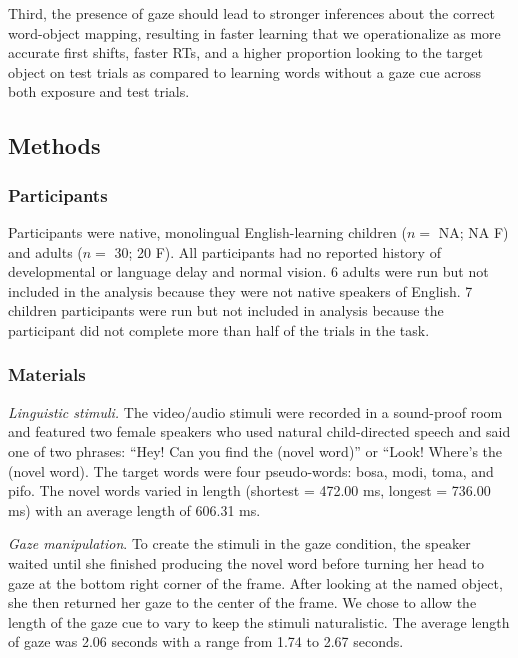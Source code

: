 \documentclass[man,floatsintext]{apa6}
\begin{document}
Third, the presence of gaze should lead to stronger inferences about the
correct word-object mapping, resulting in faster learning that we
operationalize as more accurate first shifts, faster RTs, and a higher
proportion looking to the target object on test trials as compared to
learning words without a gaze cue across both exposure and test trials.

\subsection{Methods}\label{methods-2}

\subsubsection{Participants}\label{participants-2}

Participants were native, monolingual English-learning children (\(n=\)
NA; NA F) and adults (\(n=\) 30; 20 F). All participants had no reported
history of developmental or language delay and normal vision. 6 adults
were run but not included in the analysis because they were not native
speakers of English. 7 children participants were run but not included
in analysis because the participant did not complete more than half of
the trials in the task.

\subsubsection{Materials}\label{materials-2}

\emph{Linguistic stimuli.} The video/audio stimuli were recorded in a
sound-proof room and featured two female speakers who used natural
child-directed speech and said one of two phrases: \enquote{Hey! Can you
find the (novel word)} or ``Look! Where's the (novel word). The target
words were four pseudo-words: bosa, modi, toma, and pifo. The novel
words varied in length (shortest = 472.00 ms, longest = 736.00 ms) with
an average length of 606.31 ms.

\emph{Gaze manipulation}. To create the stimuli in the gaze condition,
the speaker waited until she finished producing the novel word before
turning her head to gaze at the bottom right corner of the frame. After
looking at the named object, she then returned her gaze to the center of
the frame. We chose to allow the length of the gaze cue to vary to keep
the stimuli naturalistic. The average length of gaze was 2.06 seconds
with a range from 1.74 to 2.67 seconds.
\end{document}
